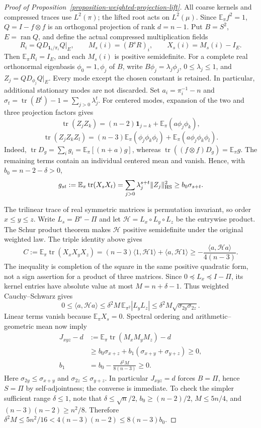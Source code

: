 \documentclass[a4paper,11pt,reqno]{amsart}
\theoremstyle{plain}
\theoremstyle{definition}
\theoremstyle{remark}
\begin{document}
\begin{proof}[Proof of Proposition~\ref{proposition-weighted-projection-lift}]
All coarse kernels and compressed traces use $L^2(\pi)$;
the lifted root acts on $L^2(\mu)$.
Since $\mathbb E_\pi f^2=1$, $Q=I-f\otimes f$ is an orthogonal
projection of rank $d=n-1$.  Put $B=S^2$, $E=\operatorname{ran}Q$,
and define the actual compressed multiplication fields
\[
 R_i=QD_{\mathbf1_i/\pi_i}Q|_E,\qquad
 M_s(i)=(B^sR)_i,\qquad X_s(i)=M_s(i)-I_E.
\]
Then $\mathbb E_\pi R_i=I_E$, and each $M_s(i)$ is positive
semidefinite.  For a complete real orthonormal eigenbasis
$\phi_0=1,\phi_j$ of $B$, write $B\phi_j=\lambda_j\phi_j$,
$0\le\lambda_j\le1$, and $Z_j=QD_{\phi_j}Q|_E$.
Every mode except the chosen constant is retained.  In particular,
additional stationary modes are not discarded.  Set
$a_i=\pi_i^{-1}-n$ and
$\sigma_t=\operatorname{tr}(B^t)-1=\sum_{j>0}\lambda_j^t$.
For centered modes, expansion of the two and three projection factors
gives
\[
 \operatorname{tr}(Z_jZ_k)
 =(n-2)\mathbf1_{j=k}+\mathbb E_\pi(a\phi_j\phi_k),
\]
\[
 \operatorname{tr}(Z_jZ_kZ_l)
 =(n-3)\mathbb E_\pi(\phi_j\phi_k\phi_l)
       +\mathbb E_\pi(a\phi_j\phi_k\phi_l).
\]
Indeed, $\operatorname{tr}D_g=\sum_i g_i
=\mathbb E_\pi[(n+a)g]$, whereas
$\operatorname{tr}((f\otimes f)D_g)=\mathbb E_\pi g$.
The remaining terms contain an individual centered mean and vanish.
Hence, with $b_0=n-2-\delta>0$,
\[
 g_{st}:=\mathbb E_\pi\operatorname{tr}(X_sX_t)
 =\sum_{j>0}\lambda_j^{s+t}\|Z_j\|_{\rm HS}^2
 \ge b_0\sigma_{s+t}.
\]

The trilinear trace of real symmetric matrices is permutation invariant,
so order $x\le y\le z$.  Write $L_s=B^s-\Pi$ and let
$\mathcal H=L_x\circ L_y\circ L_z$ be the entrywise product.
The Schur product theorem makes $\mathcal H$ positive semidefinite
under the original weighted law.  The triple identity above gives
\[
 C:=\mathbb E_\pi\operatorname{tr}(X_xX_yX_z)
 =(n-3)\langle1,\mathcal H1\rangle
       +\langle a,\mathcal H1\rangle
 \ge-\frac{\langle a,\mathcal Ha\rangle}{4(n-3)}.
\]
The inequality is completion of the square in the same positive
quadratic form, not a sign assertion for a product of three matrices.
Since $0\preceq L_x\preceq I-\Pi$, its kernel entries have absolute
value at most $M=n+\delta-1$.  Thus weighted Cauchy--Schwarz gives
\[
 0\le\langle a,\mathcal Ha\rangle
 \le\delta^2M\,\mathbb E_{\pi^2}|L_yL_z|
 \le\delta^2M\sqrt{\sigma_{2y}\sigma_{2z}}.
\]
Linear terms vanish because $\mathbb E_\pi X_s=0$.
Spectral ordering and arithmetic--geometric mean now imply
\[
 \begin{aligned}
 J_{xyz}-d
 &:=
 \mathbb E_\pi\operatorname{tr}(M_xM_yM_z)-d\\
 &\ge b_0\sigma_{x+z}
   +b_1(\sigma_{x+y}+\sigma_{y+z})\ge0,\\
 b_1&=b_0-\frac{\delta^2M}{8(n-3)}\ge0.
 \end{aligned}
\]
Here $\sigma_{2y}\le\sigma_{x+y}$ and
$\sigma_{2z}\le\sigma_{y+z}$.  In particular $J_{xyz}=d$ forces
$B=\Pi$, hence $S=\Pi$ by self-adjointness; the converse is immediate.
To check the simpler sufficient range $\delta\le1$, note that
$\delta\le\sqrt n/2$, $b_0\ge(n-2)/2$, $M\le5n/4$, and
$(n-3)(n-2)\ge n^2/8$.  Therefore
$\delta^2M\le5n^2/16<4(n-3)(n-2)\le8(n-3)b_0$.


\end{proof}
\end{document}
